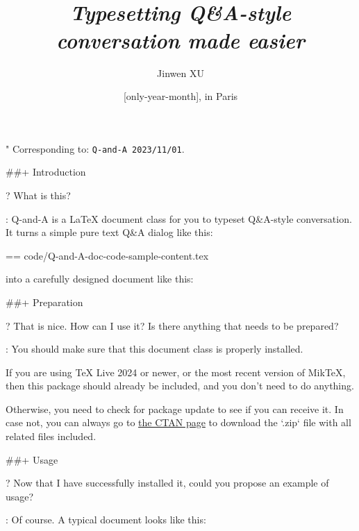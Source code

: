 \documentclass[%
  use style = classical,
  scroll,
]{Q-and-A}
\title{\QApackage{}\\\smallskip\itshape Typesetting Q\&A-style conversation made easier}
\author{Jinwen XU}
\date{\TheDate{\PackageVersion}[only-year-month], in Paris}
\def\PackageVersion{2023/11/01}
\def\PackageSubVersion{}
\newcommand{\QApackage}{{\normalfont\textsf{Q-and-A}}}
\begin{document}
\maketitle

"
  Corresponding to: {\normalfont\texttt{\QApackage{}~\PackageVersion\PackageSubVersion}}.


##+ {Introduction}

?
  What is this?

:
  \QApackage{} is a \LaTeX{} document class for you to typeset Q\&A-style conversation. It turns a simple pure text Q\&A dialog like this:

  == {code/Q-and-A-doc-code-sample-content.tex}

  into a carefully designed document like this:

  \begin{center}
  \end{center}


##+ {Preparation}

?
  That is nice. How can I use it? Is there anything that needs to be prepared?

:
  You should make sure that this document class is properly installed.

  If you are using TeX Live 2024 or newer, or the most recent version of MikTeX, then this package should already be included, and you don't need to do anything.

  Otherwise, you need to check for package update to see if you can receive it. In case not, you can always go to \href{https://ctan.org/pkg/Q-and-A}{the CTAN page} to download the `.zip` file with all related files included.


##+ {Usage}

?
  Now that I have successfully installed it, could you propose an example of usage?

:
  Of course. A typical document looks like this:
\end{document}
